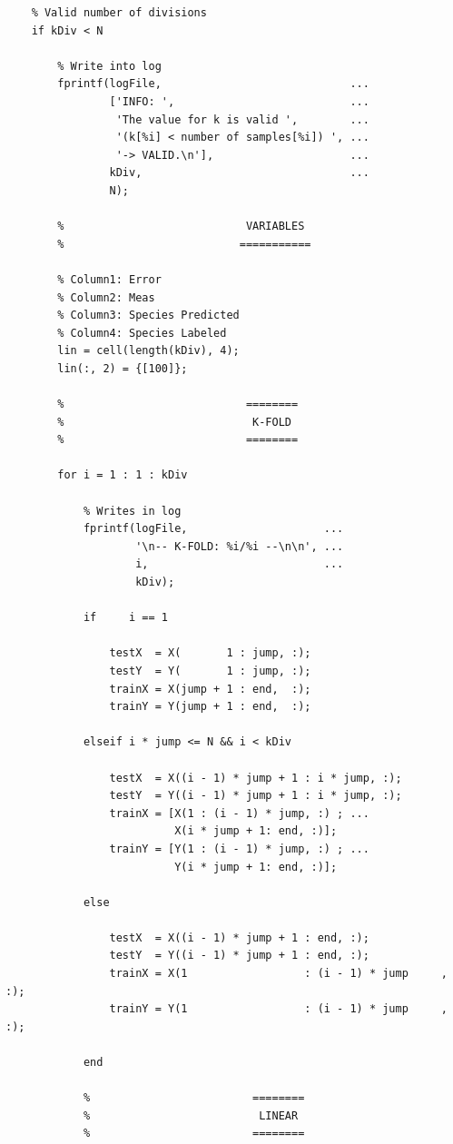 \documentclass[11pt]{article}
\begin{document}
\begin{verbatim}
    % Valid number of divisions
    if kDiv < N

        % Write into log
        fprintf(logFile,                             ...
                ['INFO: ',                           ...
                 'The value for k is valid ',        ...
                 '(k[%i] < number of samples[%i]) ', ...
                 '-> VALID.\n'],                     ...
                kDiv,                                ...
                N);

        %                            VARIABLES
        %                           ===========

        % Column1: Error
        % Column2: Meas
        % Column3: Species Predicted
        % Column4: Species Labeled
        lin = cell(length(kDiv), 4);
        lin(:, 2) = {[100]};

        %                            ========
        %                             K-FOLD
        %                            ========

        for i = 1 : 1 : kDiv

            % Writes in log
            fprintf(logFile,                     ...
                    '\n-- K-FOLD: %i/%i --\n\n', ...
                    i,                           ...
                    kDiv);

            if     i == 1

                testX  = X(       1 : jump, :);
                testY  = Y(       1 : jump, :);
                trainX = X(jump + 1 : end,  :);
                trainY = Y(jump + 1 : end,  :);

            elseif i * jump <= N && i < kDiv 

                testX  = X((i - 1) * jump + 1 : i * jump, :);
                testY  = Y((i - 1) * jump + 1 : i * jump, :);
                trainX = [X(1 : (i - 1) * jump, :) ; ...
                          X(i * jump + 1: end, :)];
                trainY = [Y(1 : (i - 1) * jump, :) ; ...
                          Y(i * jump + 1: end, :)];

            else

                testX  = X((i - 1) * jump + 1 : end, :);
                testY  = Y((i - 1) * jump + 1 : end, :);
                trainX = X(1                  : (i - 1) * jump     , :);
                trainY = Y(1                  : (i - 1) * jump     , :);

            end

            %                         ========
            %                          LINEAR
            %                         ========


\end{verbatim}
\end{document}
